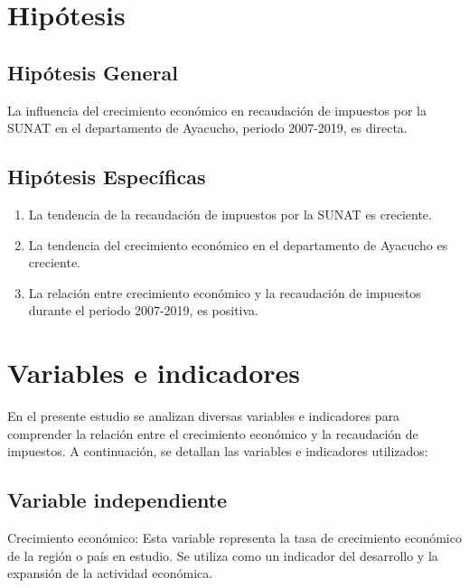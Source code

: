 \documentclass[
  jou,
  floatsintext,
  longtable,
  a4paper,
  nolmodern,
  notxfonts,
  notimes,
  12pt,
  colorlinks=true,linkcolor=blue,citecolor=blue,urlcolor=blue]{apa7}
\begin{document}
\section{Hipótesis}\label{sec-hipuxf3tesis}

\subsection{Hipótesis General}\label{sec-hipuxf3tesis-general}

La influencia del crecimiento económico en recaudación de impuestos por
la SUNAT en el departamento de Ayacucho, periodo 2007-2019, es directa.

\subsection{Hipótesis
Específicas}\label{sec-hipuxf3tesis-especuxedficas}

\begin{enumerate}
\def\labelenumi{\arabic{enumi}.}
\item
  La tendencia de la recaudación de impuestos por la SUNAT es creciente.
\item
  La tendencia del crecimiento económico en el departamento de Ayacucho
  es creciente.
\item
  La relación entre crecimiento económico y la recaudación de impuestos
  durante el periodo 2007-2019, es positiva.
\end{enumerate}

\section{Variables e indicadores}\label{sec-variables-e-indicadores}

En el presente estudio se analizan diversas variables e indicadores para
comprender la relación entre el crecimiento económico y la recaudación
de impuestos. A continuación, se detallan las variables e indicadores
utilizados:

\subsection{Variable independiente}\label{sec-variable-independiente}

Crecimiento económico: Esta variable representa la tasa de crecimiento
económico de la región o país en estudio. Se utiliza como un indicador
del desarrollo y la expansión de la actividad económica.
\end{document}
